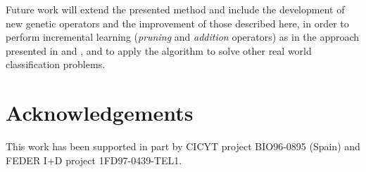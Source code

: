 \documentclass{llncs}
\begin{document}
Future work will extend the presented method and include the development of new genetic operators and the improvement of those described here, in order to perform incremental learning (\emph{pruning} and \emph{addition} operators) as in the approach presented in  \cite{FahlmanCASCOR} and \cite{Pelillo}, and to apply the algorithm to solve other real world classification problems.


\section{Acknowledgements}
\label{sec:ackn}
This work has been supported in part by CICYT project BIO96-0895 (Spain) and FEDER I+D project 1FD97-0439-TEL1.




\end{document}
